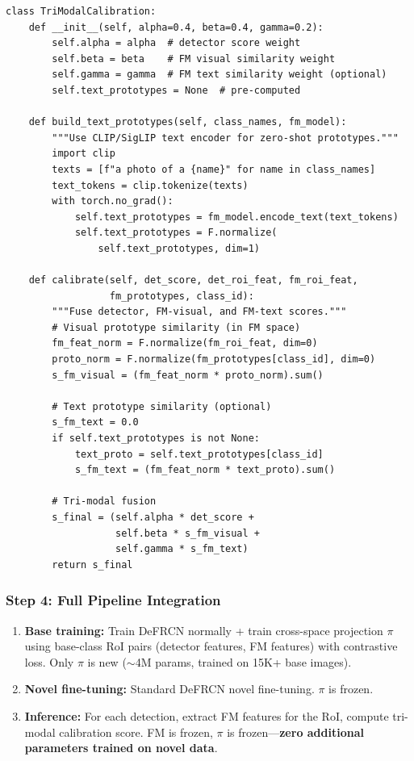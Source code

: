 \documentclass[11pt,a4paper]{article}
\begin{document}
\begin{lstlisting}[caption={Tri-modal score calibration}]
class TriModalCalibration:
    def __init__(self, alpha=0.4, beta=0.4, gamma=0.2):
        self.alpha = alpha  # detector score weight
        self.beta = beta    # FM visual similarity weight
        self.gamma = gamma  # FM text similarity weight (optional)
        self.text_prototypes = None  # pre-computed

    def build_text_prototypes(self, class_names, fm_model):
        """Use CLIP/SigLIP text encoder for zero-shot prototypes."""
        import clip
        texts = [f"a photo of a {name}" for name in class_names]
        text_tokens = clip.tokenize(texts)
        with torch.no_grad():
            self.text_prototypes = fm_model.encode_text(text_tokens)
            self.text_prototypes = F.normalize(
                self.text_prototypes, dim=1)

    def calibrate(self, det_score, det_roi_feat, fm_roi_feat,
                  fm_prototypes, class_id):
        """Fuse detector, FM-visual, and FM-text scores."""
        # Visual prototype similarity (in FM space)
        fm_feat_norm = F.normalize(fm_roi_feat, dim=0)
        proto_norm = F.normalize(fm_prototypes[class_id], dim=0)
        s_fm_visual = (fm_feat_norm * proto_norm).sum()

        # Text prototype similarity (optional)
        s_fm_text = 0.0
        if self.text_prototypes is not None:
            text_proto = self.text_prototypes[class_id]
            s_fm_text = (fm_feat_norm * text_proto).sum()

        # Tri-modal fusion
        s_final = (self.alpha * det_score +
                   self.beta * s_fm_visual +
                   self.gamma * s_fm_text)
        return s_final
\end{lstlisting}

\subsubsection{Step 4: Full Pipeline Integration}

\begin{enumerate}[nosep]
    \item \textbf{Base training:} Train DeFRCN normally + train cross-space projection $\pi$ using base-class RoI pairs (detector features, FM features) with contrastive loss. Only $\pi$ is new ($\sim$4M params, trained on 15K+ base images).
    \item \textbf{Novel fine-tuning:} Standard DeFRCN novel fine-tuning. $\pi$ is frozen.
    \item \textbf{Inference:} For each detection, extract FM features for the RoI, compute tri-modal calibration score. FM is frozen, $\pi$ is frozen---\textbf{zero additional parameters trained on novel data}.
\end{enumerate}
\end{document}

